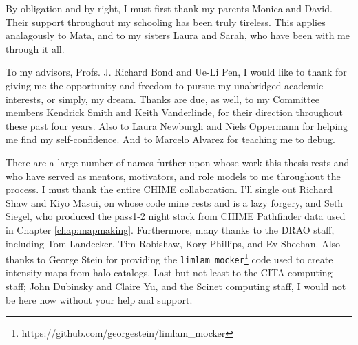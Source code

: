 \begin{acknowledgements}

By obligation and by right, I must first thank my parents Monica and David. Their support throughout my schooling has been truly tireless. This applies analagously to Mata, and to my sisters Laura and Sarah, who have been with me through it all.

To my advisors, Profs. J. Richard Bond and Ue-Li Pen, I would like to thank for giving me the opportunity and freedom to pursue my unabridged academic interests, or simply, my dream. Thanks are due, as well, to my Committee members Kendrick Smith and Keith Vanderlinde, for their direction throughout these past four years. Also to Laura Newburgh and Niels Oppermann for helping me find my self-confidence. And to Marcelo Alvarez for teaching me to debug.

There are a large number of names further upon whose work this thesis rests and who have served as mentors, motivators, and role models to me throughout the process. I must thank the entire CHIME collaboration. I'll single out Richard Shaw and Kiyo Masui, on whose code mine rests and is a lazy forgery, and Seth Siegel, who produced the pass1-2 night stack from CHIME Pathfinder data used in Chapter \ref{chap:mapmaking}. Furthermore, many thanks to the DRAO staff, including Tom Landecker, Tim Robishaw, Kory Phillips, and Ev Sheehan. Also thanks to George Stein for providing the \texttt{limlam\_mocker}\footnote{https://github.com/georgestein/limlam\_mocker} code used to create intensity maps from halo catalogs. Last but not least to the CITA computing staff; John Dubinsky and Claire Yu, and the Scinet computing staff, I would not be here now without your help and support.

\end{acknowledgements}

